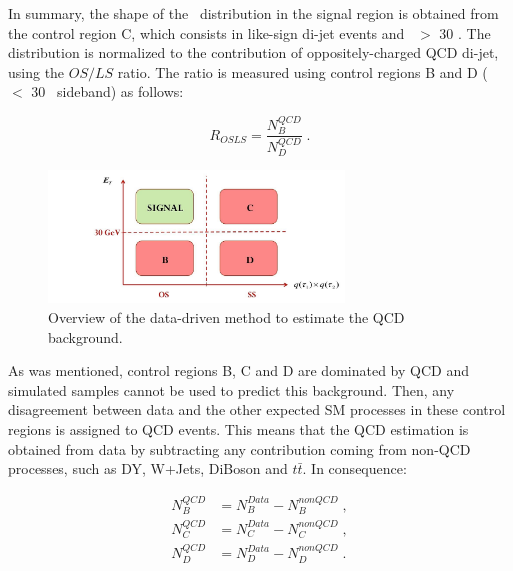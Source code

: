 \noindent In summary, the shape of the \mass~distribution in the 
signal region is obtained from the control region C, which consists
in like-sign di-jet events and \MET~$>$ 30 \GeV. The distribution
is normalized to the contribution of oppositely-charged QCD di-jet,
using the $OS/LS$ ratio. The ratio is measured using control regions B 
and D (\MET~$<$ 30 \GeV~sideband) as follows:
 
 \begin{equation} \label{eq:ratio}
  R_{OSLS} = \frac{N_{B}^{QCD}}{N_{D}^{QCD}} \; .
 \end{equation}

\begin{figure}[H]
 \begin{center}
 \captionsetup[subfloat]{farskip=0pt,captionskip=0.0cm,labelformat=empty}
 \includegraphics[clip,width=0.7\textwidth]{figuras/Chapter5/QCD_Estimation/QCD_Strategy}
  \end{center}
 \caption{Overview of the data-driven method to estimate the QCD background.}
\label{fig:QCD_Strategy} 
 \end{figure}


\noindent As was mentioned, control regions B, C and D are dominated by QCD
and simulated samples cannot be used to predict this background. Then, 
any disagreement between data and the other expected SM processes
in these control regions is assigned to QCD events. This means that
the QCD estimation is obtained from data by subtracting any 
contribution coming from non-QCD processes, such as DY, W+Jets, DiBoson and $t\bar{t}$. In consequence:

\begin{equation} \label{eq:QCD}
\begin{split}
 N_{B}^{QCD} &= N_{B}^{Data} - N_{B}^{nonQCD}\; , \\
 N_{C}^{QCD} &= N_{C}^{Data} - N_{C}^{nonQCD}\; , \\
 N_{D}^{QCD} &= N_{D}^{Data} - N_{D}^{nonQCD}\; . \\
\end{split}
\end{equation}

